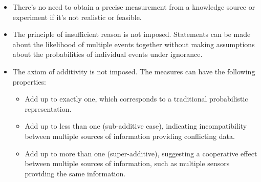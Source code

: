 \documentclass[12pt, a4paper]{report}
\begin{document}
    \begin{itemize}
        \item There's no need to obtain a precise measurement from a knowledge source or experiment if it's not realistic or feasible.
        \item The principle of insufficient reason is not imposed. 
            Statements can be made about the likelihood of multiple events together without making assumptions about the probabilities of individual events under ignorance.
        \item The axiom of additivity is not imposed. 
            The measures can have the following properties:
            \begin{itemize}
                \item Add up to exactly one, which corresponds to a traditional probabilistic representation.
                \item Add up to less than one (sub-additive case), indicating incompatibility between multiple sources of information providing conflicting data.
                \item Add up to more than one (super-additive), suggesting a cooperative effect between multiple sources of information, such as multiple sensors providing the same information.
            \end{itemize}
    \end{itemize}
    
\end{document}
